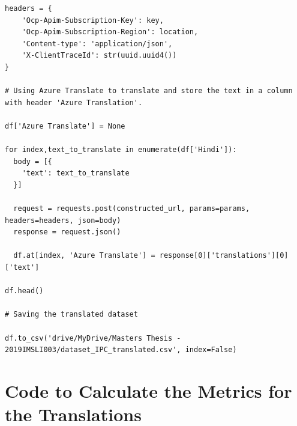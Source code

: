 \begin{verbatim}
headers = {
    'Ocp-Apim-Subscription-Key': key,
    'Ocp-Apim-Subscription-Region': location,
    'Content-type': 'application/json',
    'X-ClientTraceId': str(uuid.uuid4())
}

# Using Azure Translate to translate and store the text in a column with header 'Azure Translation'.

df['Azure Translate'] = None

for index,text_to_translate in enumerate(df['Hindi']):
  body = [{
    'text': text_to_translate
  }]

  request = requests.post(constructed_url, params=params, headers=headers, json=body)
  response = request.json()

  df.at[index, 'Azure Translate'] = response[0]['translations'][0]['text']

df.head()

# Saving the translated dataset

df.to_csv('drive/MyDrive/Masters Thesis - 2019IMSLI003/dataset_IPC_translated.csv', index=False)
\end{verbatim}
\doublespacing

\section*{Code to Calculate the Metrics for the Translations}

